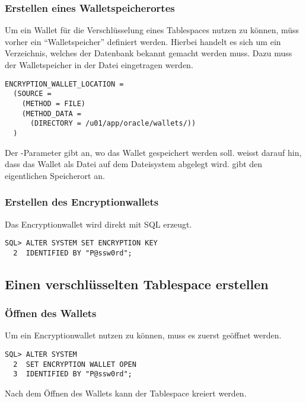         \subsubsection{Erstellen eines Walletspeicherortes}
          Um ein Wallet für die Verschlüsselung eines Tablespaces nutzen zu
          können, müss vorher ein \enquote{Walletspeicher} definiert werden.
          Hierbei handelt es sich um ein Verzeichnis, welches der Datenbank
          bekannt gemacht werden muss. Dazu muss der Walletspeicher in der Datei
           eingetragen werden.
          \begin{lstlisting}[caption={Ein Encryptionwallet
          registrieren},label=admin837,language=configfile]
ENCRYPTION_WALLET_LOCATION =
  (SOURCE =
    (METHOD = FILE)
    (METHOD_DATA =
      (DIRECTORY = /u01/app/oracle/wallets/))
  )
          \end{lstlisting}
          Der -Parameter  gibt an, wo das Wallet gespeichert werden soll.  weisst darauf hin, dass das Wallet als Datei auf dem Dateisystem abgelegt wird.  gibt den eigentlichen Speicherort an.
        \subsubsection{Erstellen des Encryptionwallets}
          Das Encryptionwallet wird direkt mit SQL erzeugt.
          \begin{lstlisting}[caption={Ein Encryptionwallet erzeugen},label=admin838,language=oracle_sql]
SQL> ALTER SYSTEM SET ENCRYPTION KEY
  2  IDENTIFIED BY "P@ssw0rd";
          \end{lstlisting}
      \subsection{Einen verschlüsselten Tablespace erstellen}
        \subsubsection{Öffnen des Wallets}
          Um ein Encryptionwallet nutzen zu können, muss es zuerst geöffnet werden.
          \begin{lstlisting}[caption={Ein Encryptionwallet öffnen},label=admin839,language=oracle_sql]
SQL> ALTER SYSTEM
  2  SET ENCRYPTION WALLET OPEN
  3  IDENTIFIED BY "P@ssw0rd";
          \end{lstlisting}
          Nach dem Öffnen des Wallets kann der Tablespace kreiert werden.
